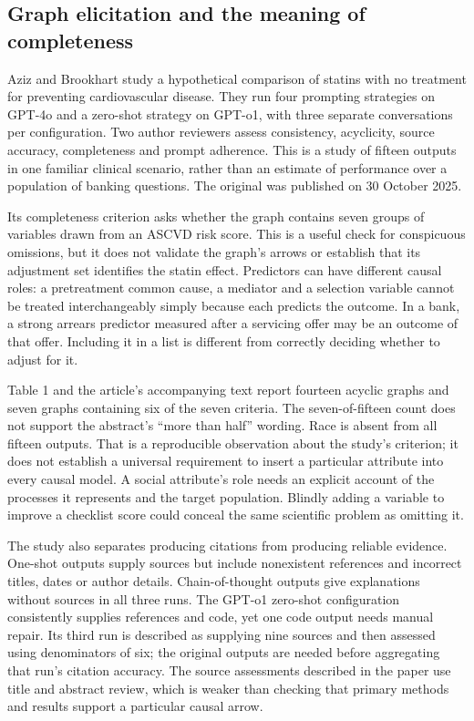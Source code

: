 \subsection{Graph elicitation and the meaning of completeness}
\label{exec22:domain-elicitation}

Aziz and Brookhart study a hypothetical comparison of statins with no treatment
for preventing cardiovascular disease. They run four prompting strategies on
GPT-4o and a zero-shot strategy on GPT-o1, with three separate conversations per
configuration. Two author reviewers assess consistency, acyclicity, source
accuracy, completeness and prompt adherence. This is a study of fifteen outputs
in one familiar clinical scenario, rather than an estimate of performance over
a population of banking questions. The original was published on 30 October
2025. \cite{exec22_domain_aziz}

Its completeness criterion asks whether the graph contains seven groups of
variables drawn from an ASCVD risk score. This is a useful check for conspicuous
omissions, but it does not validate the graph's arrows or establish that its
adjustment set identifies the statin effect. Predictors can have different causal
roles: a pretreatment common cause, a mediator and a selection variable cannot
be treated interchangeably simply because each predicts the outcome. In a bank,
a strong arrears predictor measured after a servicing offer may be an outcome
of that offer. Including it in a list is different from correctly deciding
whether to adjust for it.

Table 1 and the article's accompanying text report fourteen acyclic graphs and
seven graphs containing six of the seven criteria. The seven-of-fifteen count
does not support the abstract's ``more than half'' wording. Race is absent from
all fifteen outputs. That is a reproducible observation about the study's
criterion; it does not establish a universal requirement to insert a particular
attribute into every causal model. A social attribute's role needs an explicit
account of the processes it represents and the target population. Blindly
adding a variable to improve a checklist score could conceal the same scientific
problem as omitting it. \cite{exec22_domain_aziz,exec22_domain_reference}

The study also separates producing citations from producing reliable evidence.
One-shot outputs supply sources but include nonexistent references and incorrect
titles, dates or author details. Chain-of-thought outputs give explanations
without sources in all three runs. The GPT-o1 zero-shot configuration consistently
supplies references and code, yet one code output needs manual repair. Its third
run is described as supplying nine sources and then assessed using denominators
of six; the original outputs are needed before aggregating that run's citation
accuracy. The source assessments described in the paper use title and abstract
review, which is weaker than checking that primary methods and results support
a particular causal arrow. \cite{exec22_domain_aziz}

